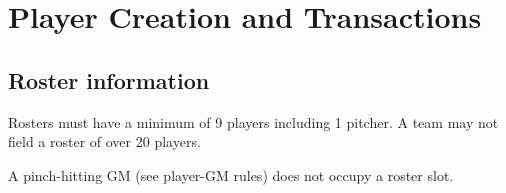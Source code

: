 
\section{Player Creation and Transactions}

\subsection{Roster information}
\begin{deepEnumerate}
    \item Rosters must have a minimum of 9 players including 1 pitcher.
          A team may not field a roster of over 20 players.
          \begin{deepEnumerate}
              \item A pinch-hitting GM (see player-GM rules) %
                    does not occupy a roster slot.
          \end{deepEnumerate}
\end{deepEnumerate}

